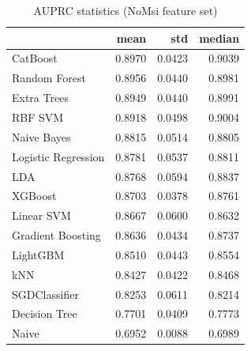 \begin{table}
\caption{AUPRC statistics (NoMsi feature set)}
\label{tab:auprc_NoMsi_stats}
\begin{tabular}{lrrr}
\toprule
 & mean & std & median \\
\midrule
CatBoost & 0.8970 & 0.0423 & 0.9039 \\
Random Forest & 0.8956 & 0.0440 & 0.8981 \\
Extra Trees & 0.8949 & 0.0440 & 0.8991 \\
RBF SVM & 0.8918 & 0.0498 & 0.9004 \\
Naive Bayes & 0.8815 & 0.0514 & 0.8805 \\
Logistic Regression & 0.8781 & 0.0537 & 0.8811 \\
LDA & 0.8768 & 0.0594 & 0.8837 \\
XGBoost & 0.8703 & 0.0378 & 0.8761 \\
Linear SVM & 0.8667 & 0.0600 & 0.8632 \\
Gradient Boosting & 0.8636 & 0.0434 & 0.8737 \\
LightGBM & 0.8510 & 0.0443 & 0.8554 \\
kNN & 0.8427 & 0.0422 & 0.8468 \\
SGDClassifier & 0.8253 & 0.0611 & 0.8214 \\
Decision Tree & 0.7701 & 0.0409 & 0.7773 \\
Naive & 0.6952 & 0.0088 & 0.6989 \\
\bottomrule
\end{tabular}
\end{table}
